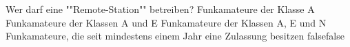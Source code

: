     {Wer darf eine ""Remote-Station"" betreiben?}
    {Funkamateure der Klasse A}
    {Funkamateure der Klassen A und E}
    {Funkamateure der Klassen A, E und N}
    {Funkamateure, die seit mindestens einem Jahr eine Zulassung besitzen}
    {false}{false}